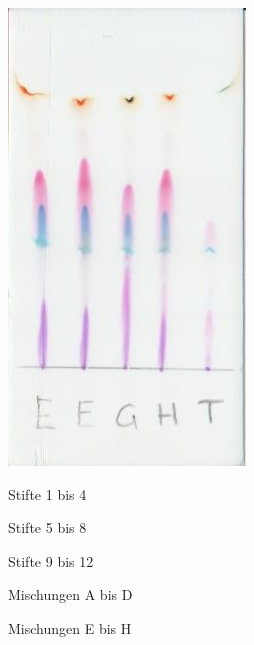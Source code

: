 \documentclass[11pt,paper=a4,final]{scrartcl}
\begin{document}
\begin{figure}[h!]
  \includegraphics{e-h}
  \caption{Stifte 1 bis 4}
  \caption{Stifte 5 bis 8}
  \caption{Stifte 9 bis 12}
  \caption{Mischungen A bis D}
  \caption{Mischungen E bis H}
\end{figure}
\end{document}

